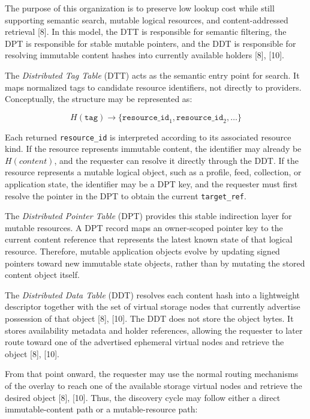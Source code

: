 \documentclass[12pt,a4paper]{article}
\begin{document}
The purpose of this organization is to preserve low lookup cost while still supporting semantic search, mutable logical resources, and content-addressed retrieval [8]. In this model, the DTT is responsible for semantic filtering, the DPT is responsible for stable mutable pointers, and the DDT is responsible for resolving immutable content hashes into currently available holders [8], [10].

The \textit{Distributed Tag Table} (DTT) acts as the semantic entry point for search. It maps normalized tags to candidate resource identifiers, not directly to providers. Conceptually, the structure may be represented as:

\[
H(\texttt{tag}) \rightarrow \{\texttt{resource\_id}_1, \texttt{resource\_id}_2, \dots\}
\]

Each returned \texttt{resource\_id} is interpreted according to its associated resource kind. If the resource represents immutable content, the identifier may already be \(H(content)\), and the requester can resolve it directly through the DDT. If the resource represents a mutable logical object, such as a profile, feed, collection, or application state, the identifier may be a DPT key, and the requester must first resolve the pointer in the DPT to obtain the current \texttt{target\_ref}.

The \textit{Distributed Pointer Table} (DPT) provides this stable indirection layer for mutable resources. A DPT record maps an owner-scoped pointer key to the current content reference that represents the latest known state of that logical resource. Therefore, mutable application objects evolve by updating signed pointers toward new immutable state objects, rather than by mutating the stored content object itself.

The \textit{Distributed Data Table} (DDT) resolves each content hash into a lightweight descriptor together with the set of virtual storage nodes that currently advertise possession of that object [8], [10]. The DDT does not store the object bytes. It stores availability metadata and holder references, allowing the requester to later route toward one of the advertised ephemeral virtual nodes and retrieve the object [8], [10].

From that point onward, the requester may use the normal routing mechanisms of the overlay to reach one of the available storage virtual nodes and retrieve the desired object [8], [10]. Thus, the discovery cycle may follow either a direct immutable-content path or a mutable-resource path:
\end{document}
